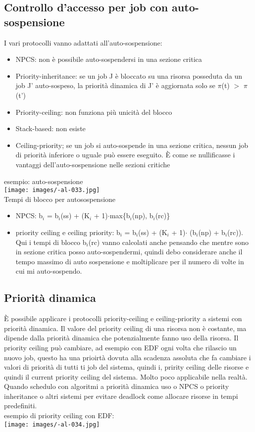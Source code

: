 \documentclass{article}
\begin{document}
\subsection{Controllo d'accesso per job con auto-sospensione}
I vari protocolli vanno adattati all'auto-sospensione:
\begin{itemize}
\item NPCS: non è possibile auto-sospendersi in una sezione critica
\item Priority-inheritance: se un job J è bloccato su una risorsa posseduta da un job J' auto-sospeso, la priorità dinamica di J' è aggiornata solo se $\pi$(t) $>$ $\pi$(t')
\item Priority-ceiling: non funziona più unicità del blocco
\item Stack-based: non esiste
\item Ceiling-priority; se un job si auto-sospende in una sezione critica, nessun job di priorità inferiore o uguale può essere eseguito. È come se nullificasse i vantaggi dell'auto-sospensione nelle sezioni critiche
\end{itemize}
esempio: auto-sospensione\\
\texttt{[image: images/-al-033.jpg]}\\
Tempi di blocco per autosospensione
\begin{itemize}
\item NPCS: b$_{i}$ = b$_{i}$(ss) + (K$_{i}$ + 1)$\cdot$max\{b$_{i}$(np), b$_{i}$(rc)\}
\item priority ceiling e ceiling priority: b$_{i}$ = b$_{i}$(ss) + (K$_{i}$ + 1)$\cdot$ (b$_{i}$(np) + b$_{i}$(rc)). Qui i tempi di blocco b$_{i}$(rc) vanno calcolati anche pensando che mentre sono in sezione critica posso auto-sospendermi, quindi debo considerare anche il tempo massimo di auto sospensione e moltiplicare per il numero di volte in cui mi auto-sospendo.
\end{itemize}
\subsection{Priorità dinamica}
È possibile applicare i protocolli priority-ceiling e ceiling-priority a sistemi con priorità dinamica. Il valore del priority ceiling di una risorsa non è costante, ma dipende dalla priorità dinamica che potenzialmente fanno uso della risorsa. Il priority ceiling può cambiare, ad esempio con EDF ogni volta che rilascio un nuovo job, questo ha una prioirtà dovuta alla scadenza assoluta che fa cambiare i valori di priorità di tutti ti job del sistema, quindi i, pririty ceiling delle risorse e quindi il current priority ceiling del sistema. Molto poco applicabile nella realtà. Quando schedulo con algoritmi a priorità dinamica uso o NPCS o priority inheritance o altri sistemi per evitare deadlock come allocare risorse in tempi predefiniti.\\ esempio di priority ceiling con EDF:\\
\texttt{[image: images/-al-034.jpg]}
\end{document}
